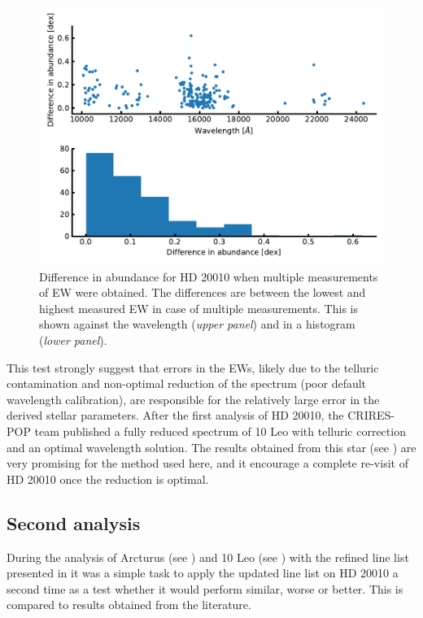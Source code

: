 \begin{figure}[htpb!]
    \centering
    \includegraphics[width=0.8\linewidth]{figures/HD20010abundance_error.pdf}
    \caption{Difference in abundance for HD 20010 when multiple measurements of EW were obtained.
             The differences are between the lowest and highest measured EW in case of multiple
             measurements. This is shown against the wavelength (\emph{upper panel}) and in a
             histogram (\emph{lower panel}).}
    \label{fig:HD20010abundance}
\end{figure}


This test strongly suggest that errors in the EWs, likely due to the telluric contamination and
non-optimal reduction of the spectrum (poor default wavelength calibration), are responsible for the
relatively large error in the derived stellar parameters. After the first analysis of HD 20010, the
CRIRES-POP team published a fully reduced spectrum of 10 Leo \citep{Nicholls2017} with telluric
correction and an optimal wavelength solution. The results obtained from this star (see
) are very promising for the method used here, and it encourage a complete re-visit
of HD 20010 once the reduction is optimal.


\subsection{Second analysis}
\label{sec:HD20010_second}

During the analysis of Arcturus (see ) and 10 Leo (see ) with the
refined line list presented in  it was a simple task to apply the updated
line list on HD 20010 a second time as a test whether it would perform similar, worse or better.
This is compared to results obtained from the literature.

